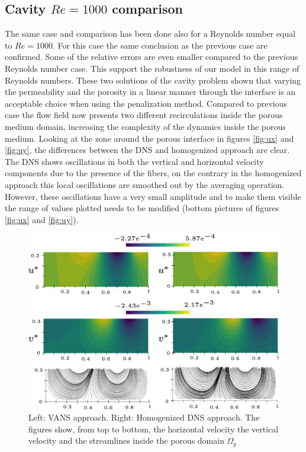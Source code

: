 \subsection{Cavity $Re=1000$ comparison}

The same case and comparison has been done also for a Reynolds number equal to $Re=1000$.
For this case the same conclusion as the previous case are confirmed. Some of the relative errors are even smaller compared to the previous Reynolds number case. This support the robustness of our model in this range of Reynolds numbers.
These two solutions of the cavity problem shown that varying the permeability and the porosity in a linear manner through the interface is an acceptable choice when using the penalization method.
Compared to previous case the flow field now presents two different recirculations inside the porous medium domain, increasing the complexity of the dynamics inside the porous medium. Looking at the zone around the porous interface in figures \ref{fig:ux} and \ref{fig:uy}, the differences between the DNS and homogenized approach are clear. The DNS shows oscillations in both the vertical and horizontal velocity components due to the presence of the fibers, on the contrary in the homogenized approach this local oscillations are smoothed out by the averaging operation. However, these oscillations have a very small amplitude and to make them visible the range of values plotted needs to be modified (bottom pictures of figures \ref{fig:ux} and \ref{fig:uy}).

\begin{figure}[H]
	\centering
	\includegraphics[width=1\linewidth]{chapter_5/figure/re1000/vans_u}
	\caption{Left: VANS approach. Right: Homogenized DNS approach. The figures show, from top to bottom, the horizontal velocity the vertical velocity and the streamlines inside the porous domain $\Omega_p$}
	\label{fig:1000_u}
\end{figure}

